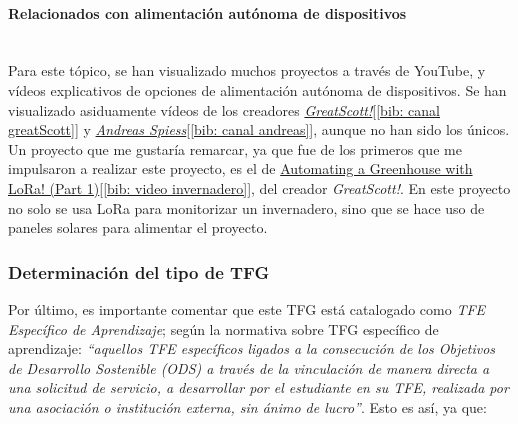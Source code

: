 \documentclass[12pt]{article}
\newcommand{\subsubsubsection}[1]{\paragraph{#1}\mbox{}\\}
\begin{document}
	\subsubsubsection{Relacionados con alimentación autónoma de dispositivos}
	
	\noindent Para este tópico, se han visualizado muchos proyectos a través de YouTube, y vídeos explicativos de opciones de alimentación autónoma de dispositivos. 
	Se han visualizado asiduamente vídeos de los creadores \href{https://www.youtube.com/channel/UC6mIxFTvXkWQVEHPsEdflzQ}{\textit{GreatScott!}}[\ref{bib: canal greatScott}] y \href{https://www.youtube.com/channel/UCu7_D0o48KbfhpEohoP7YSQ}{\textit{Andreas Spiess}}[\ref{bib: canal andreas}], aunque no han sido los únicos. Un proyecto que me gustaría remarcar, ya que fue de los primeros que me impulsaron a realizar este proyecto, es el de \href{https://www.youtube.com/watch?v=2YJHcGQnpAk}{Automating a Greenhouse with LoRa! (Part 1)}[\ref{bib: video invernadero}], del creador \textit{GreatScott!}. En este proyecto no solo se usa LoRa para monitorizar un invernadero, sino que se hace uso de paneles solares para alimentar el proyecto. 
	
	\subsubsection{Determinación del tipo de TFG}
	
	\noindent Por último, es importante comentar que este TFG está catalogado como \textit{TFE Específico de Aprendizaje}; según la normativa sobre TFG específico de aprendizaje: \textit{``aquellos TFE específicos ligados a la consecución de los Objetivos de Desarrollo Sostenible (ODS) a través de la vinculación de manera directa a una solicitud de servicio, a desarrollar por el estudiante en su TFE, realizada por una asociación o institución externa, sin ánimo de lucro''}. Esto es así, ya que:
	
\end{document}
